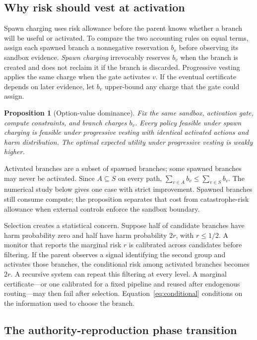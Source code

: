 \documentclass[sigconf,nonacm]{acmart}
\newtheorem{proposition}{Proposition}
\begin{document}
\subsection{Why risk should vest at activation}

Spawn charging uses risk allowance before the parent knows whether a branch will be useful or
activated.  To compare the two accounting rules on equal terms, assign each spawned branch a
nonnegative reservation $b_v$ before observing its sandbox evidence.  \emph{Spawn charging}
irrevocably reserves $b_v$ when the branch is created and does not reclaim it if the branch is
discarded.  Progressive vesting applies the same charge when
the gate activates $v$.  If the eventual certificate depends on later evidence, let $b_v$
upper-bound any charge that the gate could assign.

\begin{proposition}[Option-value dominance]
Fix the same sandbox, activation gate, compute constraints, and branch charges $b_v$.
Every policy feasible under spawn charging is feasible under progressive vesting with identical
activated actions and harm distribution.  The optimal expected utility under
progressive vesting is weakly higher.
\end{proposition}

Activated branches are a subset of spawned branches; some spawned branches may never be
activated.  Since $A\subseteq S$ on every path,
$\sum_{v\in A}b_v\leq\sum_{v\in S}b_v$.  The numerical study below gives one case with strict
improvement.  Spawned branches still consume compute; the proposition separates that cost from
catastrophe-risk allowance when external controls enforce the sandbox boundary.

Selection creates a statistical concern.  Suppose half of candidate branches have harm
probability zero and half have harm probability $2r$, with $r\leq1/2$.  A monitor that reports
the marginal risk $r$ is calibrated across candidates before filtering.  If the parent observes
a signal identifying the second group and activates those branches, the conditional risk among
activated branches becomes $2r$.  A recursive system can repeat this filtering at every level.
A marginal certificate---or one calibrated for a fixed pipeline and reused after endogenous
routing---may then fail after selection.  Equation~\eqref{eq:conditional} conditions on the
information used to choose the branch.

\subsection{The authority-reproduction phase transition}
\end{document}
